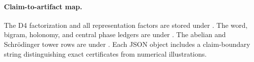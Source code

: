 \paragraph{Claim-to-artifact map.}
The D4 factorization and all representation factors are stored under
. The word, bigram, holonomy, and central
phase ledgers are under . The abelian and
Schrödinger tower rows are under
. Each JSON object includes a
claim-boundary string distinguishing exact certificates from numerical
illustrations.
